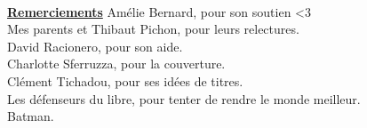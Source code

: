 \begin{titlepage}
~\vfill
\begin{center}
\begin{minipage}[c]{15cm}
	\begin{center}
	{\large \textbf{\underline{Remerciements}}}
	\linebreak
	\linebreak
	Amélie Bernard, pour son soutien <3\\
	Mes parents et Thibaut Pichon, pour leurs relectures.\\
	David Racionero, pour son aide.\\
	Charlotte Sferruzza, pour la couverture.\\
	Clément Tichadou, pour ses idées de titres.\\
	Les défenseurs du libre, pour tenter de rendre le monde meilleur.\\
	Batman.
	\end{center}
\end{minipage}

\vspace{240pt}


\end{center}
\end{titlepage}
